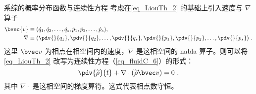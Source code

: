 \begin{corollary}{系综的概率分布函数与连续性方程}
考虑在\autoref{eq_LiouTh_2} 的基础上引入速度与 $\nabla$ 算子
\begin{equation}
\begin{aligned}
\bvec{v} &\equiv (\dot q_1, \dot q_2, \dots, \dot q_s, \dot p_1, \dot p_2, \dots, \dot p_s), \\
\nabla &\equiv (\pdv{}{q_1}, \pdv{}{q_2}, \dots, \pdv{}{q_s}, \pdv{}{p_1}, \pdv{}{p_2}, \dots, \pdv{}{p_s}) ~.
\end{aligned}
\end{equation}
这里 $\bvec v$ 为相点在相空间内的速度，$\nabla$ 是这相空间的 nabla 算子。则可以将\autoref{eq_LiouTh_2} 改写为连续性方程（\autoref{eq_fluidC_6}）的形式：
\begin{equation}
\pdv{\widetilde \rho}{t} + \nabla \cdot \left(  \widetilde \rho \bvec v\right) = 0 ~.
\end{equation}
其中 $\nabla \cdot$ 是这相空间的梯度算符。这式代表相点数守恒。
\end{corollary}

